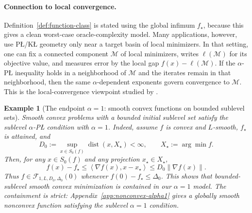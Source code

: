 \documentclass[11pt]{article}
\newtheorem{example}[theorem]{Example}
\newcommand{\norm}[1]{\left\lVert #1\right\rVert}
\newcommand{\ip}[2]{\left\langle #1,#2\right\rangle}
\begin{document}

\paragraph{Connection to local convergence.}
Definition~\ref{def:function-class} is stated using the global infimum \(f_\star\), because this gives a clean
worst-case oracle-complexity model. Many applications, however, use P\L{}/K\L{} geometry only near a target basin of
local minimizers. In that setting, one can fix a connected component \(\mathcal M\) of local minimizers, writes
\(\ell(\mathcal M)\) for its objective value, and measures error by the local gap \(f(x)-\ell(\mathcal M)\). If the
\(\alpha\)-P\L{} inequality holds in a neighborhood of \(\mathcal M\) and the iterates remain in that neighborhood, then
the same \(\alpha\)-dependent exponents govern convergence to \(\mathcal M\). This is the local-convergence viewpoint
studied by \citet{MasihaSalehkaleybarHeKiyavashThiran2026}.

\begin{example}[The endpoint \(\alpha=1\): smooth convex functions on bounded sublevel sets]
\label{ex:alpha1-convex}
Smooth convex problems with a bounded initial sublevel set satisfy the sublevel \(\alpha\)-P\L{} condition with
\(\alpha=1\). Indeed, assume
\(f\) is convex and \(L\)-smooth, \(f_\star\) is attained, and
\[
D_0:=\sup_{x\in S_0(f)} \operatorname{dist}(x,X_\star)<\infty,
\qquad
X_\star:=\arg\min f .
\]
Then, for any \(x\in S_0(f)\) and any projection \(x_\star\in X_\star\),
\[
f(x)-f_\star
\le
\ip{\nabla f(x)}{x-x_\star}
\le
D_0\norm{\nabla f(x)}.
\]
Thus \(f\in\mathcal F_{1,L,D_0,\Delta_0}(0)\) whenever \(f(0)-f_\star\le \Delta_0\). This shows that bounded-sublevel
smooth convex minimization is contained in our \(\alpha=1\) model. The containment is strict: Appendix~\ref{app:nonconvex-alpha1}
gives a globally smooth nonconvex function satisfying the sublevel \(\alpha=1\) condition.
\end{example}
\end{document}

